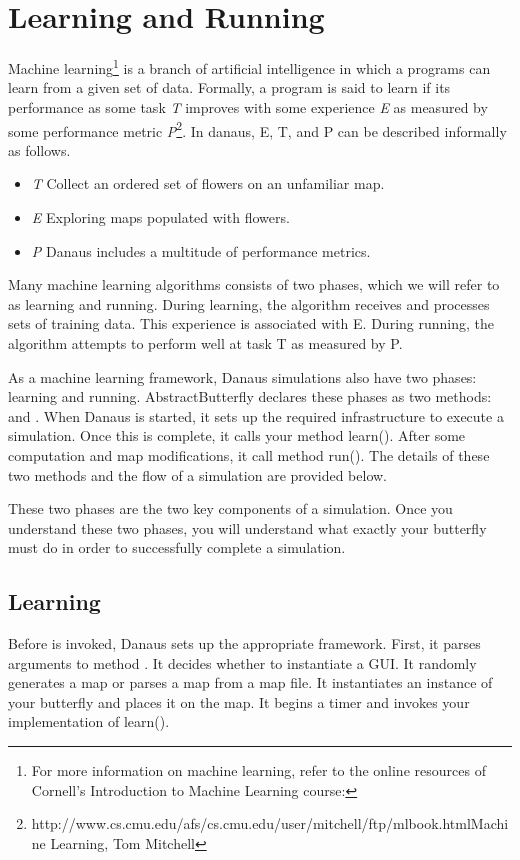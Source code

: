 \documentclass{pset}
\begin{document}
\section{Learning and Running}\label{sec:learnrun}
Machine learning\footnote{For more information on machine learning, refer to
    the online resources of Cornell's Introduction to Machine Learning course:
} is a branch
of artificial intelligence in which a programs can learn from a given set of
data. Formally, a program is said to learn if its performance as some task
\emph{T} improves with some experience \emph{E} as measured by some performance
metric
\emph{P}\footnote{\link
    {http://www.cs.cmu.edu/afs/cs.cmu.edu/user/mitchell/ftp/mlbook.html}{Machine
Learning, Tom Mitchell}}. In danaus, E, T, and P can be described informally as
follows.
\begin{itemize}
    \item \emph{T} Collect an ordered set of flowers on an unfamiliar map.
    \item \emph{E} Exploring maps populated with flowers.
    \item \emph{P} Danaus includes a multitude of performance metrics.
\end{itemize}

Many machine learning algorithms consists of two phases, which we will refer to
as learning and running. During learning, the algorithm receives and processes
sets of training data. This experience is associated with E. During running,
the algorithm attempts to perform well at task T as measured by P.

As a machine learning framework, Danaus simulations also have two phases:
learning and running. AbstractButterfly declares these phases as two methods:
 and  
. When Danaus is started, it  sets up the required
infrastructure to execute a simulation. Once this is complete, it calls your
method learn(). After some computation and map modifications, it call method
run(). The details of these two methods and the flow of a simulation are
provided below.

These two phases are the two key components of a simulation. Once you
understand these two phases, you will understand what exactly your butterfly
must do in order to successfully complete a simulation.

\ifx \LEARNING \undefined \else
\subsection{Learning}
Before  is invoked, Danaus sets up the appropriate framework.
First, it parses arguments to method . It decides whether to
instantiate a GUI\@. It randomly generates a map or parses a map from a map file.
It instantiates an instance of your butterfly and places it on the map. It
begins a timer and invokes your implementation of learn(). 
\end{document}
